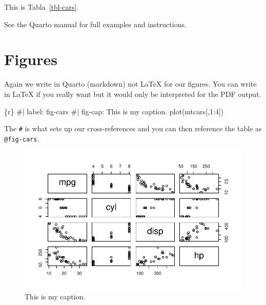 \documentclass[
  letterpaper,
  11pt,
  spanish,
  singlespacing,
  headsepline]{MastersDoctoralThesis}
\newenvironment{Shaded}{\begin{snugshade}}{\end{snugshade}}
\newcommand{\CommentTok}[1]{\textcolor[rgb]{0.37,0.37,0.37}{#1}}
\newcommand{\DecValTok}[1]{\textcolor[rgb]{0.68,0.00,0.00}{#1}}
\newcommand{\FunctionTok}[1]{\textcolor[rgb]{0.28,0.35,0.67}{#1}}
\newcommand{\InformationTok}[1]{\textcolor[rgb]{0.37,0.37,0.37}{#1}}
\newcommand{\NormalTok}[1]{\textcolor[rgb]{0.00,0.23,0.31}{#1}}
\newcommand{\SpecialCharTok}[1]{\textcolor[rgb]{0.37,0.37,0.37}{#1}}
\begin{document}
This is Tabla~\ref{tbl-cars}.

See the Quarto manual for full examples and instructions.

\hypertarget{figures}{%
\section{Figures}\label{figures}}

Again we write in Quarto (markdown) not \LaTeX{} for our figures. You
can write in \LaTeX{} if you really want but it would only be
interpreted for the PDF output.

\begin{Shaded}
\begin{Highlighting}[]
\InformationTok{\textasciigrave{}\textasciigrave{}\textasciigrave{}\{r\}}
\CommentTok{\#| label: fig{-}cars}
\CommentTok{\#| fig{-}cap: This is my caption.}
\FunctionTok{plot}\NormalTok{(mtcars[,}\DecValTok{1}\SpecialCharTok{:}\DecValTok{4}\NormalTok{])}
\InformationTok{\textasciigrave{}\textasciigrave{}\textasciigrave{}}
\end{Highlighting}
\end{Shaded}

The \texttt{\#\textbar{}} is what sets up our cross-references and you
can then reference the table as \texttt{@fig-cars}.

\begin{figure}

{\centering \includegraphics{index_files/figure-pdf/fig-cars-1.pdf}

}

\caption{\label{fig-cars}This is my caption.}

\end{figure}
\end{document}
